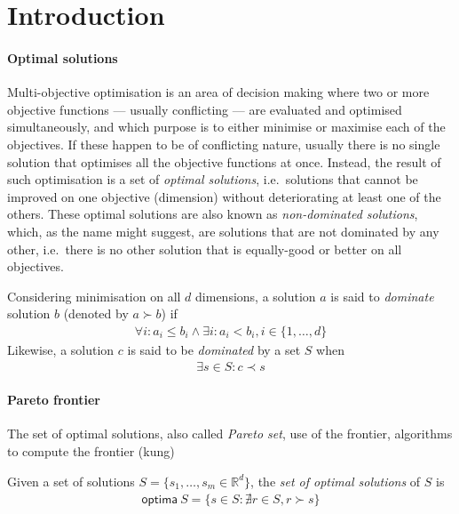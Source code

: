 \section{Introduction}

\paragraph{Optimal solutions} Multi-objective optimisation is an area of decision making where two or more objective functions --- usually conflicting --- are evaluated and optimised simultaneously, and which purpose is to either minimise or maximise each of the objectives. If these happen to be of conflicting nature, usually there is no single solution that optimises all the objective functions at once. Instead, the result of such optimisation is a set of \textit{optimal solutions}, i.e.\ solutions that cannot be improved on one objective (dimension) without deteriorating at least one of the others. These optimal solutions are also known as \textit{non-dominated solutions}, which, as the name might suggest, are solutions that are not dominated by any other, i.e.\ there is no other solution that is equally-good or better on all objectives.

\begin{defn}
Considering minimisation on all $d$ dimensions, a solution $a$ is said to \textit{dominate} solution $b$ (denoted by $a \succ b$) if
\begin{align*}
\forall i: a_i \leq b_i \land \exists i: a_i < b_i, i \in \{1,\dotsc,d\}
\end{align*}
Likewise, a solution $c$ is said to be \textit{dominated} by a set $S$ when
\begin{align*}
\exists s \in S: c \prec s
\end{align*}
\end{defn}

\paragraph{Pareto frontier} The set of optimal solutions, also called \textit{Pareto set}, use of the frontier, algorithms to compute the frontier (kung)

\begin{defn} 
Given a set of solutions $S = \{s_1,\dotsc,s_m \in \mathbb{R}^d\}$, the \textit{set of optimal solutions} of $S$ is
\begin{align*}
\mathsf{optima}\ S = \{s \in S: \nexists r \in S, r \succ s\}
\end{align*}
\end{defn}

